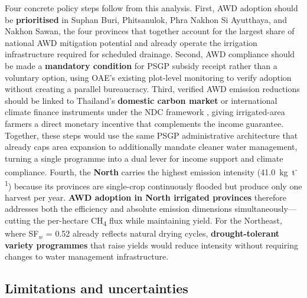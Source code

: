 \documentclass[fleqn,10pt]{olplainarticle}
\begin{document}
Four concrete policy steps follow from this analysis.
First, AWD adoption should be \textbf{prioritised} in Suphan Buri, Phitsanulok,
Phra Nakhon Si Ayutthaya, and Nakhon Sawan, the four provinces that together
account for the largest share of national AWD mitigation potential and already
operate the irrigation infrastructure required for scheduled drainage.
Second, AWD compliance should be made a \textbf{mandatory condition} for
PSGP subsidy receipt rather than a voluntary option, using OAE's existing
plot-level monitoring to verify adoption without creating a parallel
bureaucracy.
Third, verified AWD emission reductions should be linked to Thailand's
\textbf{domestic carbon market} or international climate finance instruments
under the NDC framework \citep{thailand_ndc2022}, giving irrigated-area
farmers a direct monetary incentive that complements the income guarantee.
Together, these steps would use the same PSGP administrative architecture
that already caps area expansion to additionally mandate cleaner water
management, turning a single programme into a dual lever for income support
and climate compliance.
Fourth, the \textbf{North} carries the highest emission intensity
(41.0~kg~t\textsuperscript{-1}) because its provinces are single-crop
continuously flooded but produce only one harvest per year.
\textbf{AWD adoption in North irrigated provinces} therefore addresses both the
efficiency and absolute emission dimensions simultaneously---cutting the
per-hectare CH\textsubscript{4} flux while maintaining yield.
For the Northeast, where SF$_w$ = 0.52 already reflects natural drying cycles,
\textbf{drought-tolerant variety programmes} that raise yields would reduce
intensity without requiring changes to water management infrastructure.

\subsection*{Limitations and uncertainties}
\end{document}
